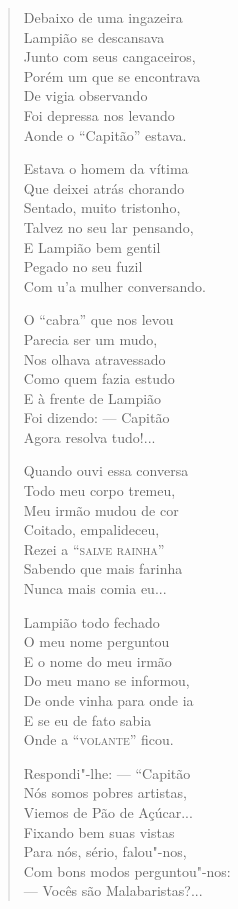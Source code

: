 \begin{verse}
Debaixo de uma ingazeira \\
Lampião se descansava \\
Junto com seus cangaceiros, \\
Porém um que se encontrava \\
De vigia observando \\
Foi depressa nos levando \\
Aonde o ``Capitão'' estava. 
\pagebreak

Estava o homem da vítima \\
Que deixei atrás chorando \\
Sentado, muito tristonho, \\
Talvez no seu lar pensando, \\
E Lampião bem gentil \\
Pegado no seu fuzil \\
Com u'a mulher conversando. 

O ``cabra'' que nos levou \\
Parecia ser um mudo, \\
Nos olhava atravessado \\
Como quem fazia estudo \\
E à frente de Lampião \\
Foi dizendo: ---  Capitão \\
Agora resolva tudo!... 

Quando ouvi essa conversa \\
Todo meu corpo tremeu, \\
Meu irmão mudou de cor \\
Coitado, empalideceu, \\
Rezei a ``\textsc{salve rainha}'' \\
Sabendo que mais farinha \\
Nunca mais comia eu...

Lampião todo fechado \\
O meu nome perguntou \\
E o nome do meu irmão \\
Do meu mano se informou, \\
De onde vinha para onde ia \\
E se eu de fato sabia \\
Onde a ``\textsc{volante}'' ficou. 
\pagebreak

Respondi"-lhe: ---  ``Capitão \\
Nós somos pobres artistas, \\
Viemos de Pão de Açúcar... \\
Fixando bem suas vistas \\
Para nós, sério, falou"-nos, \\
Com bons modos perguntou"-nos:\\
---  Vocês são Malabaristas?...


\end{verse}
